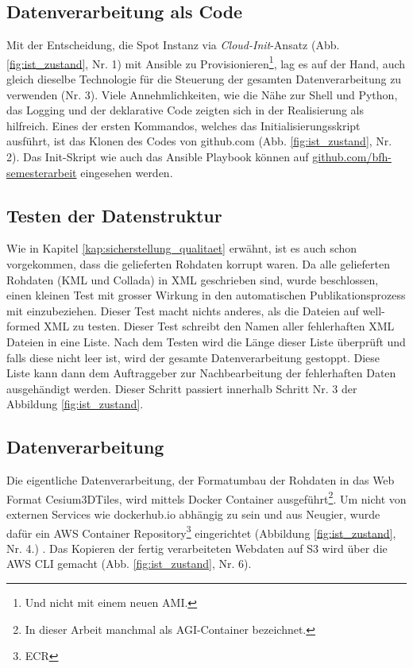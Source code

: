 \subsection{Datenverarbeitung als Code}
Mit der Entscheidung, die Spot Instanz via \emph{Cloud-Init}-Ansatz (Abb. \ref{fig:ist_zustand}, Nr. 1) mit Ansible zu Provisionieren\footnote{Und nicht mit einem neuen AMI.}, lag es auf der Hand, auch gleich dieselbe Technologie für die Steuerung der gesamten Datenverarbeitung zu verwenden (Nr. 3). 
Viele Annehmlichkeiten, wie die Nähe zur Shell und Python, das Logging und der deklarative Code zeigten sich in der Realisierung als hilfreich. Eines der ersten Kommandos, welches das Initialisierungsskript ausführt, ist das Klonen des Codes von github.com (Abb. \ref{fig:ist_zustand}, Nr. 2). Das Init-Skript wie auch das Ansible Playbook können auf \href{https://github.com/bfh-semesterarbeit/up-and-running-dataprocessing}{github.com/bfh-semesterarbeit} eingesehen werden.


\subsection{Testen der Datenstruktur}
Wie in Kapitel \ref{kap:sicherstellung_qualitaet} erwähnt, ist es auch schon vorgekommen, dass die gelieferten Rohdaten korrupt waren. Da alle gelieferten Rohdaten (KML und Collada) in XML geschrieben sind, wurde beschlossen, einen kleinen Test mit grosser Wirkung in den automatischen Publikationsprozess mit einzubeziehen. Dieser Test macht nichts anderes, als die Dateien auf well-formed XML zu testen. 
Dieser Test schreibt den Namen aller fehlerhaften XML Dateien in eine Liste. Nach dem Testen wird die Länge dieser Liste überprüft und falls diese nicht leer ist, wird der gesamte Datenverarbeitung gestoppt. Diese Liste kann dann dem Auftraggeber zur Nachbearbeitung der fehlerhaften Daten ausgehändigt werden. Dieser Schritt passiert innerhalb Schritt Nr. 3 der  Abbildung \ref{fig:ist_zustand}.

\subsection{Datenverarbeitung}
Die eigentliche Datenverarbeitung, der Formatumbau der Rohdaten in das Web Format Cesium3DTiles, wird mittels Docker Container ausgeführt\footnote{In dieser Arbeit manchmal als AGI-Container bezeichnet.}. Um nicht von externen Services wie dockerhub.io abhängig zu sein und aus Neugier, wurde dafür ein AWS Container Repository\footnote{ECR} eingerichtet (Abbildung \ref{fig:ist_zustand}, Nr. 4.) \cite{9781484251003}. Das Kopieren der fertig verarbeiteten Webdaten auf S3 wird über die AWS CLI gemacht (Abb. \ref{fig:ist_zustand}, Nr. 6).

